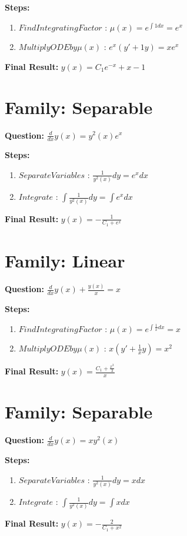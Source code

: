 \documentclass{article}
\begin{document}
\textbf{Steps:}
\begin{enumerate}
\item $Find Integrating Factor$ :  $\mu(x) = e^{\int 1 dx} = e^{x}$
\item $Multiply ODE by \mu(x)$ :  $e^{x}(y' + 1y) = x e^{x}$
\end{enumerate}
\textbf{Final Result:} $y{\left(x \right)} = C_{1} e^{- x} + x - 1$

\section*{Family: Separable}
\textbf{Question:} $\frac{d}{d x} y{\left(x \right)} = y^{2}{\left(x \right)} e^{x}$

\textbf{Steps:}
\begin{enumerate}
\item $Separate Variables$ :  $\frac{1}{y^{2}{\left(x \right)}} dy = e^{x} dx$
\item $Integrate$ :  $\int \frac{1}{y^{2}{\left(x \right)}} dy = \int e^{x} dx$
\end{enumerate}
\textbf{Final Result:} $y{\left(x \right)} = - \frac{1}{C_{1} + e^{x}}$

\section*{Family: Linear}
\textbf{Question:} $\frac{d}{d x} y{\left(x \right)} + \frac{y{\left(x \right)}}{x} = x$

\textbf{Steps:}
\begin{enumerate}
\item $Find Integrating Factor$ :  $\mu(x) = e^{\int \frac{1}{x} dx} = x$
\item $Multiply ODE by \mu(x)$ :  $x(y' + \frac{1}{x}y) = x^{2}$
\end{enumerate}
\textbf{Final Result:} $y{\left(x \right)} = \frac{C_{1} + \frac{x^{3}}{3}}{x}$

\section*{Family: Separable}
\textbf{Question:} $\frac{d}{d x} y{\left(x \right)} = x y^{2}{\left(x \right)}$

\textbf{Steps:}
\begin{enumerate}
\item $Separate Variables$ :  $\frac{1}{y^{2}{\left(x \right)}} dy = x dx$
\item $Integrate$ :  $\int \frac{1}{y^{2}{\left(x \right)}} dy = \int x dx$
\end{enumerate}
\textbf{Final Result:} $y{\left(x \right)} = - \frac{2}{C_{1} + x^{2}}$
\end{document}
